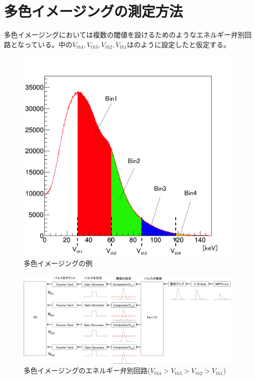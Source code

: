 \section{多色イメージングの測定方法}

多色イメージングにおいては複数の閾値を設けるためのようなエネルギー弁別回路となっている。中の$V_{th4},V_{th3},V_{th2},V_{th1}$はのように設定したと仮定する。


\begin{figure}[H]
 \begin{center}
 \includegraphics[bb=0.000000 0.000000 563.473420 540.915284,width=0.7\hsize]{image2/chapter5/spectrum_multi.png} 
 \end{center}
 \caption{多色イメージングの例}
 \label{fig:spectrum_multi}
\end{figure}


\begin{figure}[H]
 \begin{center}
 \includegraphics[bb=0.000000 0.000000 1234.937912 525.556554,width=1\hsize]{image2/chapter5/read_circuit_pulse_multi.png} 
 \end{center}
 \caption{多色イメージングのエネルギー弁別回路($V_{th4}>V_{th3}>V_{th2}>V_{th1}$)}
 \label{fig:read_circuit_pulse_multi}
\end{figure}

